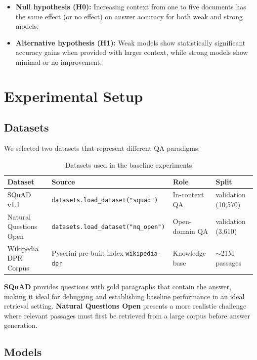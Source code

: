 \documentclass[11pt,a4paper]{article}
\begin{document}
\begin{itemize}
    \item \textbf{Null hypothesis (H0):} Increasing context from one to five documents has the same effect (or no effect) on answer accuracy for both weak and strong models.
    \item \textbf{Alternative hypothesis (H1):} Weak models show statistically significant accuracy gains when provided with larger context, while strong models show minimal or no improvement.
\end{itemize}

\section{Experimental Setup}

\subsection{Datasets}

We selected two datasets that represent different QA paradigms:

\begin{table}[H]
\centering
\caption{Datasets used in the baseline experiments}
\label{tab:datasets}
\begin{tabularx}{\textwidth}{@{} L{3cm} X L{3cm} L{3cm} @{}}
\toprule
\textbf{Dataset} & \textbf{Source} & \textbf{Role} & \textbf{Split} \\
\midrule
SQuAD v1.1 & \texttt{datasets.load\_dataset("squad")} & In-context QA & validation (10,570) \\
Natural Questions Open & \texttt{datasets.load\_dataset("nq\_open")} & Open-domain QA & validation (3,610) \\
Wikipedia DPR Corpus & Pyserini pre-built index \texttt{wikipedia-dpr} & Knowledge base & $\sim$21M passages \\
\bottomrule
\end{tabularx}
\end{table}

\textbf{SQuAD} provides questions with gold paragraphs that contain the answer, making it ideal for debugging and establishing baseline performance in an ideal retrieval setting. \textbf{Natural Questions Open} presents a more realistic challenge where relevant passages must first be retrieved from a large corpus before answer generation.

\subsection{Models}
\end{document}
